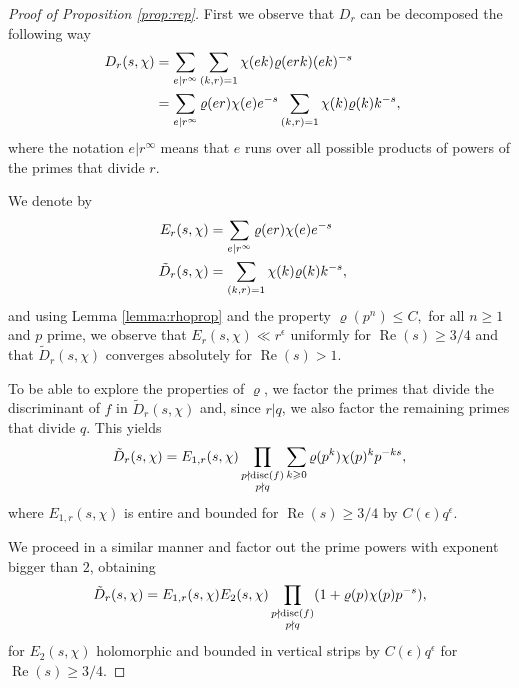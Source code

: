 \documentclass[12pt]{amsart}
\def\\{\cr}
\def\le{\leqslant}
\def\ge{\geqslant}
\begin{document}
\begin{proof}[Proof of Proposition \ref{prop:rep}]

First we observe that $D_r$ can be decomposed the following way
\begin{align*}
D_r(s, \chi) & = \sum_{e| r^{\infty}} \sum_{(k,r)=1} \chi(ek) \varrho(erk) (ek)^{-s} \\
& = \sum_{e|r^{\infty}} \varrho(er) \chi(e) e^{-s} \sum_{(k,r)=1} \chi(k) \varrho(k)k^{-s},
\end{align*}
where the notation $e|r^{\infty}$ means that $e$ runs over all possible products of powers of the primes that divide $r$.

We denote by
\begin{align*}
E_r(s,\chi)&=\sum_{e|r^{\infty}} \varrho(er) \chi(e) e^{-s} \\
\tilde{D}_r(s,\chi)&=\sum_{(k,r)=1} \chi(k) \varrho(k)k^{-s},
\end{align*}
and using Lemma \ref{lemma:rhoprop} and the property $\varrho(p^n) \le C,$ for all $n\ge 1$ and $p$ prime, we observe that $E_r(s,\chi) \ll r^\epsilon$  uniformly for $\operatorname{Re}(s) \ge 3/4$ and that $\tilde{D}_r(s,\chi)$ converges absolutely for $\operatorname{Re}(s)>1$.

To be able to explore the properties of $\varrho$, we factor the primes that divide the discriminant of $f$ in $\tilde{D}_r(s,\chi)$ and, since $r|q$, we also factor the remaining primes that divide $q$. This yields
\begin{align*}
\tilde{D}_r(s,\chi)=E_{1,r}(s,\chi) \prod_{ \substack{p\nmid\operatorname{disc}(f) \\ p\nmid q}} \sum_{k\ge 0} \varrho(p^k)\chi(p)^kp^{-ks},
\end{align*}
where $E_{1,r}(s,\chi)$ is entire and bounded for $\operatorname{Re}(s) \ge 3/4$ by $C(\epsilon)q^{\epsilon}$. 

We proceed in a similar manner and factor out the prime powers with exponent bigger than $2$,  obtaining
\begin{align}
\label{eq:reduction}
\tilde{D}_r(s,\chi)=E_{1,r}(s,\chi)E_{2}(s,\chi) \prod_{ \substack{p\nmid\operatorname{disc}(f) \\ p\nmid q}} (1+\varrho(p)\chi(p)p^{-s}),
\end{align}
for $E_2(s,\chi)$ holomorphic and bounded in vertical strips by $C(\epsilon)q^\epsilon$ for $\operatorname{Re}(s)\ge 3/4$. 


\end{proof}
\end{document}
